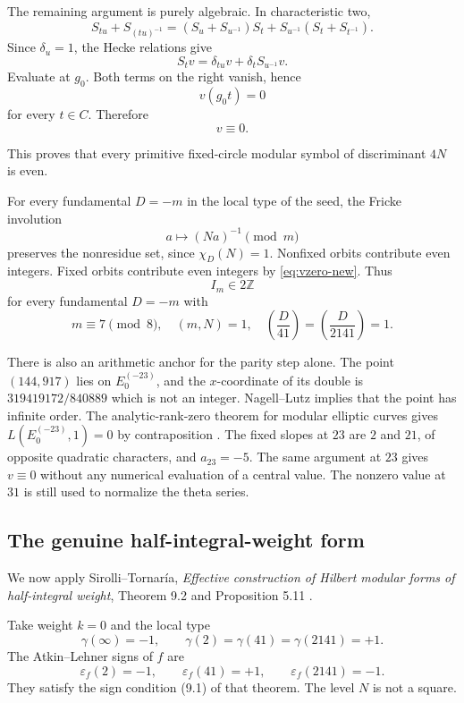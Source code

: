 \documentclass[11pt]{article}
\begin{document}
The remaining argument is purely algebraic.
In characteristic two,
\[
S_{tu}+S_{(tu)^{-1}}
=(S_u+S_{u^{-1}})S_t
+S_{u^{-1}}(S_t+S_{t^{-1}}).
\]
Since $\delta_u=1$, the Hecke relations
give
\[
S_tv=\delta_{tu}v+\delta_tS_{u^{-1}}v.
\]
Evaluate at $g_0$. Both terms on the
right vanish, hence
\[
v(g_0t)=0
\]
for every $t\in C$.
Therefore
\begin{equation}\label{eq:vzero-new}
\boxed{v\equiv0.}
\end{equation}

This proves that every primitive fixed-circle
modular symbol of discriminant $4N$ is even.

For every fundamental $D=-m$ in the local
type of the seed, the Fricke
involution
\[
a\longmapsto(Na)^{-1}\pmod m
\]
preserves the nonresidue set, since
$\chi_D(N)=1$.
Nonfixed orbits contribute even integers.
Fixed orbits contribute even integers by
\eqref{eq:vzero-new}.
Thus
\begin{equation}\label{eq:evenness-new}
\boxed{I_m\in2\mathbb Z}
\end{equation}
for every fundamental $D=-m$ with
\[
m\equiv7\pmod8,\quad(m,N)=1,\quad
\left(\frac D{41}\right)
=\left(\frac D{2141}\right)=1.
\]

There is also an arithmetic anchor for the parity step alone.
The point $(144,917)$ lies on $E_0^{(-23)}$, and the
$x$-coordinate of its double is $319419172/840889$ which is not an integer. Nagell--Lutz implies that the point has infinite order.
The analytic-rank-zero theorem for modular elliptic curves gives
$L(E_0^{(-23)},1)=0$ by contraposition \cite{Wiles}.
The fixed slopes at $23$ are $2$ and $21$, of opposite quadratic
characters, and $a_{23}=-5$. The same argument at $23$ gives
$v\equiv0$ without any numerical evaluation of a central value.
The nonzero value at $31$ is still used to normalize the theta series.

\subsection{The genuine half-integral-weight form}

We now apply Sirolli--Tornar\'ia,
\emph{Effective construction of Hilbert
modular forms of half-integral weight},
Theorem 9.2 and Proposition 5.11 \cite{ST}.

Take weight $k=0$ and the local type
\[
\gamma(\infty)=-1,\qquad
\gamma(2)=\gamma(41)=\gamma(2141)=+1.
\]
The Atkin--Lehner signs of $f$ are
\[
\varepsilon_f(2)=-1,\qquad
\varepsilon_f(41)=+1,\qquad
\varepsilon_f(2141)=-1.
\]
They satisfy the sign condition (9.1)
of that theorem. The level $N$ is not
a square.
\end{document}
